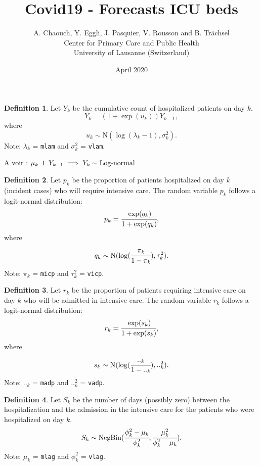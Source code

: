 \documentclass[10pt,twocolumn,a4paper]{article}
\author{
  A. Chaouch, Y. Eggli, J. Pasquier, V. Rousson and B. Trächsel\\
  Center for Primary Care and Public Health\\
  University of Lausanne (Switzerland)
}
\title{
  Covid19 - Forecasts ICU beds
}
\date{April 2020}
\newcommand\independent{\protect\mathpalette{\protect\independenT}{\perp}}
\def\independenT#1#2{\mathrel{\rlap{$#1#2$}\mkern2mu{#1#2}}}
\newcommand{\NB}{\text{NegBin}}
\theoremstyle{definition}
\newtheorem{definition}{Definition}
\theoremstyle{remark}
\theoremstyle{plain}
\begin{document}
\maketitle

\begin{definition}

  Let $Y_k$ be the cumulative count of hospitalized patients on day $k$.
  \[ Y_k = (1 + \exp(u_k)) Y_{k-1}, \]
  where
  \[ u_k \sim \text{N}(\log(\lambda_k-1), \sigma_k^2). \]
  Note: $\lambda_k$ = \verb|mlam| and $\sigma_k^2$ = \verb|vlam|.

\end{definition}

A voir : $\mu_k \independent Y_{k-1} \implies Y_k \sim \text{Log-normal}$

\begin{definition}

  Let $p_k$ be the proportion of patients hospitalized on day $k$ (incident
  cases) who will require intensive care. The random variable $p_k$ follows a
  logit-normal distribution:
  \[ p_k = \cfrac{\exp(q_k)}{1 + \exp(q_k)}, \]
  where
  \[ q_k \sim \text{N}(\log(\cfrac{\pi_k}{1-\pi_k}), \tau_k^2). \]
  Note: $\pi_k$ = \verb|micp| and $\tau_k^2$ = \verb|vicp|.

\end{definition}

\begin{definition}

  Let $r_k$ be the proportion of patients requiring intensive care on day $k$
  who will be admitted in intensive care. The random variable $r_k$ follows a
  logit-normal distribution:
  \[ r_k = \cfrac{\exp(s_k)}{1 + \exp(s_k)}, \]
  where
  \[ s_k \sim \text{N}(\log(\cfrac{.._k}{1-.._k}), .._k^2). \]
  Note: $.._k$ = \verb|madp| and $.._k^2$ = \verb|vadp|.

\end{definition}

\begin{definition}

  Let $S_k$ be the number of days (possibly zero) between the hospitalization
  and the admission in the intensive care for the patients who were
  hospitalized on day $k$.
  \[ S_k \sim \NB(\cfrac{\phi_k^2-\mu_k}{\phi_k^2},
                  \cfrac{\mu_k^2}{\phi_k^2-\mu_k}). \]
  Note: $\mu_k$ = \verb|mlag| and $\phi_k^2$ = \verb|vlag|.

\end{definition}
\end{document}
